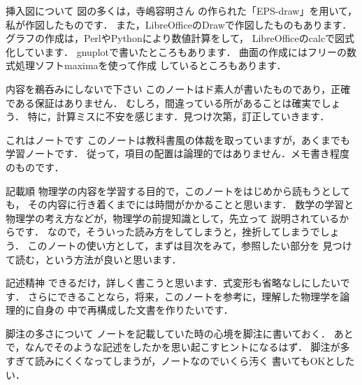 \begin{aboutthisnote}{挿入図について}
    図の多くは，寺嶋容明さん
    の作られた「EPS-draw」を用いて，私が作図したものです．
    また，LibreOfficeのDrawで作図したものもあります．
    グラフの作成は，PerlやPythonにより数値計算をして，
    LibreOfficeのcalcで図式化しています．
    gnuplotで書いたところもあります．
    曲面の作成にはフリーの数式処理ソフトmaximaを使って作成
    しているところもあります．
\end{aboutthisnote}

\begin{aboutthisnote}{内容を鵜呑みにしないで下さい}
    このノートはド素人が書いたものであり，正確である保証はありません．
    むしろ，間違っている所があることは確実でしょう．
    特に，計算ミスに不安を感じます．見つけ次第，訂正していきます．
\end{aboutthisnote}

\begin{aboutthisnote}{これはノートです}
    このノートは教科書風の体裁を取っていますが，あくまでも学習ノートです．
    従って，項目の配置は論理的ではありません．メモ書き程度のものです．
\end{aboutthisnote}

\begin{aboutthisnote}{記載順}
    物理学の内容を学習する目的で，このノートをはじめから読もうとしても，
    その内容に行き着くまでには時間がかかることと思います．
    数学の学習と物理学の考え方などが，物理学の前提知識として，先立って
    説明されているからです．
    なので，そういった読み方をしてしまうと，挫折してしまうでしょう．
    このノートの使い方として，まずは目次をみて，参照したい部分を
    見つけて読む，という方法が良いと思います．
\end{aboutthisnote}

\begin{aboutthisnote}{記述精神}
    できるだけ，詳しく書こうと思います．式変形も省略なしにしたいです．
    さらにできることなら，将来，このノートを参考に，理解した物理学を論理的に自身の
    中で再構成した文書を作りたいです．
\end{aboutthisnote}

\begin{aboutthisnote}{脚注の多さについて}
    ノートを記載していた時の心境を脚注に書いておく．
    あとで，なんでそのような記述をしたかを思い起こすヒントになるはず．
    脚注が多すぎて読みにくくなってしまうが，ノートなのでいくら汚く
    書いてもOKとしたい．
\end{aboutthisnote}

